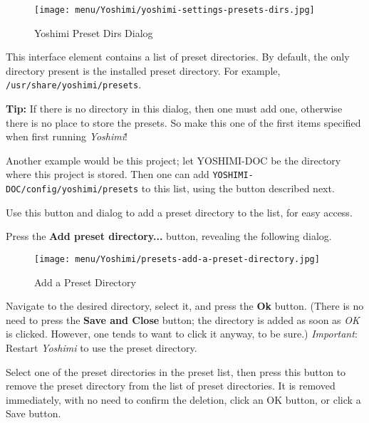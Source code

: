 \begin{figure}[H]
   \centering
   \texttt{[image: menu/Yoshimi/yoshimi-settings-presets-dirs.jpg]}
   \caption[Preset Dirs Tab]{Yoshimi Preset Dirs Dialog}
   \label{fig:yoshimi_presets_dirs_tab}
\end{figure}

   \setcounter{ItemCounter}{0}      %

   This interface element contains a list of preset directories.
   By default, the only directory present is the installed preset directory.
   For example, \texttt{/usr/share/yoshimi/presets}.

   \textbf{Tip:}
   If there is no directory in this dialog, then one must
   add one, otherwise there is no place to store the presets.
   So make this one of the first items specified when first running
   \textsl{Yoshimi}!

   Another example would be this project; let YOSHIMI-DOC be the directory
   where this project is stored.  Then one can add
   \texttt{YOSHIMI-DOC/config/yoshimi/presets} to this list, using the
   button described next.

   Use this button and dialog to add a preset directory to the list, for
   easy access.

   Press the \textbf{Add preset directory...} button, revealing the
   following dialog.

\begin{figure}[H]
   \centering
   \texttt{[image: menu/Yoshimi/presets-add-a-preset-directory.jpg]}
   \caption[Add Preset Directory]{Add a Preset Directory}
   \label{fig:presets_add_a_preset_directory}
\end{figure}

   Navigate to the desired directory, select it, and press the \textbf{Ok}
   button.  (There is no need to press the \textbf{Save and Close} button;
   the directory is added as soon as \textsl{OK} is clicked.  However, one
   tends to want to click it anyway, to be sure.)
   \textsl{Important}:  Restart \textsl{Yoshimi} to use the preset directory.

   Select one of the preset directories in the preset list, then press this
   button to remove the preset directory from the list of preset
   directories.  It is removed immediately, with no need to confirm the
   deletion, click an OK button, or click a Save button.

